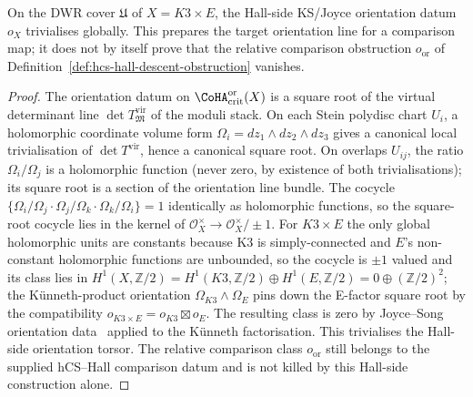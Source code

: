 \begin{proposition}
\label{prop:r6-orientation-torsor-k3e-inscribed}
On the DWR cover $\mathfrak U$ of $X=K3\times E$, the Hall-side
KS/Joyce orientation datum $o_X$ trivialises globally. This prepares
the target orientation line for a comparison map; it does not by itself
prove that the relative comparison obstruction
$o_{\mathrm{or}}$ of
Definition~\ref{def:hcs-hall-descent-obstruction} vanishes.
\end{proposition}

\begin{proof}
The orientation datum on $\CoHA_{\mathrm{crit}}^{\mathrm{or}}(X)$ is a
square root of the virtual determinant line
$\det T^{\mathrm{vir}}_{\mathfrak M}$ of the moduli stack. On each
Stein polydisc chart $U_i$, a holomorphic coordinate volume form
$\Omega_i=dz_1\wedge dz_2\wedge dz_3$ gives a canonical local
trivialisation of $\det T^{\mathrm{vir}}$, hence a canonical square
root. On overlaps $U_{ij}$, the ratio $\Omega_i/\Omega_j$ is a
holomorphic function (never zero, by existence of both
trivialisations); its square root is a section of the orientation
line bundle. The cocycle
$\{\Omega_i/\Omega_j\cdot\Omega_j/\Omega_k\cdot\Omega_k/\Omega_i\}=1$
identically as holomorphic functions, so the square-root cocycle lies
in the kernel of $\mathcal O_X^\times\to\mathcal O_X^\times/\pm 1$.
For $K3\times E$ the only global holomorphic units are constants
because K3 is simply-connected and $E$'s non-constant holomorphic
functions are unbounded, so the cocycle is $\pm 1$ valued and its
class lies in $H^1(X,\mathbb Z/2)=H^1(K3,\mathbb Z/2)\oplus
H^1(E,\mathbb Z/2)=0\oplus(\mathbb Z/2)^2$; the K\"unneth-product
orientation $\Omega_{K3}\wedge\Omega_E$ pins down the E-factor square
root by the compatibility $o_{K3\times E}=o_{K3}\boxtimes o_E$. The
resulting class is zero by Joyce--Song orientation
data~\cite{JoyceSong2012} applied to the K\"unneth factorisation. This
trivialises the Hall-side orientation torsor. The relative comparison
class $o_{\mathrm{or}}$ still belongs to the supplied hCS--Hall
comparison datum and is not killed by this Hall-side construction alone.
\end{proof}

